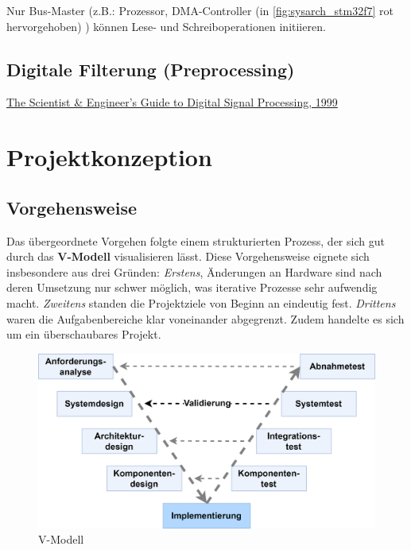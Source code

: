 \documentclass[a4paper, portrait, 12pt]{scrartcl} %
\begin{document}
Nur Bus-Master (z.B.: Prozessor, DMA-Controller (in \autoref{fig:sysarch_stm32f7} rot hervorgehoben) ) können Lese- und Schreiboperationen initiieren.

\pagebreak

\subsection{Digitale Filterung (Preprocessing)}
\href{https://www.analog.com/en/resources/technical-books/scientist_engineers_guide.html}{The Scientist \& Engineer's Guide to Digital Signal Processing, 1999}

\pagebreak

\section{Projektkonzeption}
\subsection{Vorgehensweise}
Das übergeordnete Vorgehen folgte einem strukturierten Prozess, der sich gut durch das \textbf{V-Modell} visualisieren lässt. Diese Vorgehensweise eignete sich insbesondere aus drei Gründen: \emph{Erstens}, Änderungen an Hardware sind nach deren Umsetzung nur schwer möglich, was iterative Prozesse sehr aufwendig macht. \emph{Zweitens} standen die Projektziele von Beginn an eindeutig fest. \emph{Drittens} waren die Aufgabenbereiche klar voneinander abgegrenzt. Zudem handelte es sich um ein überschaubares Projekt.

\begin{figure}[H]
\centering
    \includegraphics[scale=0.14]{V_Modell.png} 
	\caption{V-Modell}
\end{figure}
\end{document}
